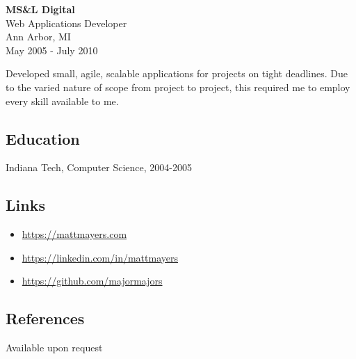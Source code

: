 \documentclass[]{article}
\providecommand{\tightlist}{%
  \setlength{\itemsep}{0pt}\setlength{\parskip}{0pt}}
\begin{document}
\textbf{MS\&L Digital}\\
Web Applications Developer\\
Ann Arbor, MI\\
May 2005 - July 2010

Developed small, agile, scalable applications for projects on tight
deadlines. Due to the varied nature of scope from project to project,
this required me to employ every skill available to me.

\subsection{Education}\label{education}

Indiana Tech, Computer Science, 2004-2005

\subsection{Links}\label{links}

\begin{itemize}
\tightlist
\item
  \url{https://mattmayers.com}
\item
  \url{https://linkedin.com/in/mattmayers}
\item
  \url{https://github.com/majormajors}
\end{itemize}

\subsection{References}\label{references}

Available upon request
\end{document}
